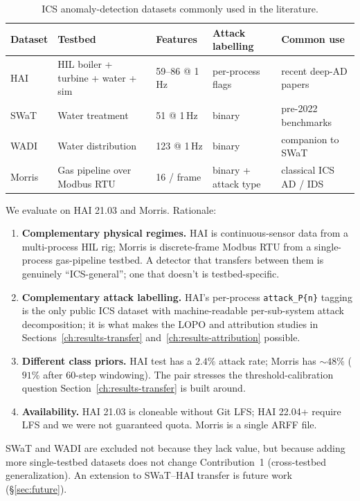 \begin{table}[h]
\centering
\caption{ICS anomaly-detection datasets commonly used in the literature.}
\label{tab:datasets}
\small
\begin{tabular}{lp{3cm}lll}
\toprule
Dataset & Testbed & Features & Attack labelling & Common use \\
\midrule
HAI \cite{shin2020hai} & HIL boiler + turbine + water + sim & 59--86 @ 1\,Hz & per-process flags & recent deep-AD papers \\
SWaT \cite{goh2017swat} & Water treatment & 51 @ 1\,Hz & binary & pre-2022 benchmarks \\
WADI \cite{ahmed2017wadi} & Water distribution & 123 @ 1\,Hz & binary & companion to SWaT \\
Morris \cite{morris2014industrial} & Gas pipeline over Modbus RTU & 16 / frame & binary + attack type & classical ICS AD / IDS \\
\bottomrule
\end{tabular}
\end{table}

We evaluate on HAI 21.03 and Morris.  Rationale:

\begin{enumerate}
  \item \textbf{Complementary physical regimes.}  HAI is continuous-sensor data from a multi-process HIL rig; Morris is discrete-frame Modbus RTU from a single-process gas-pipeline testbed.  A detector that transfers between them is genuinely ``ICS-general''; one that doesn't is testbed-specific.
  \item \textbf{Complementary attack labelling.}  HAI's per-process \texttt{attack\_P\{n\}} tagging is the only public ICS dataset with machine-readable per-sub-system attack decomposition; it is what makes the LOPO and attribution studies in Sections~\ref{ch:results-transfer} and~\ref{ch:results-attribution} possible.
  \item \textbf{Different class priors.}  HAI test has a $2.4\%$ attack rate; Morris has $\sim 48\%$ ($91\%$ after 60-step windowing).  The pair stresses the threshold-calibration question Section~\ref{ch:results-transfer} is built around.
  \item \textbf{Availability.}  HAI 21.03 is cloneable without Git LFS; HAI 22.04+ require LFS and we were not guaranteed quota.  Morris is a single ARFF file.
\end{enumerate}

SWaT and WADI are excluded not because they lack value, but because adding more single-testbed datasets does not change Contribution~1 (cross-testbed generalization).  An extension to SWaT--HAI transfer is future work (\S\ref{sec:future}).

